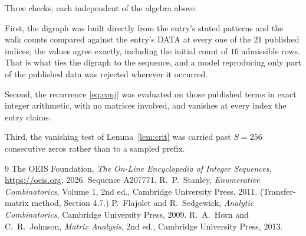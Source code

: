 \documentclass[11pt,a4paper]{article}
\theoremstyle{plain}
\theoremstyle{definition}
\begin{document}
Three checks, each independent of the algebra above.

First, the digraph was built directly from the entry's stated patterns and the walk counts
compared against the entry's DATA at every one of the $21$ published indices; the
values agree exactly, including the initial count of $16$ admissible rows. That is
what ties the digraph to the sequence, and a model reproducing only part of the published
data was rejected wherever it occurred.

Second, the recurrence \eqref{eq:conj} was evaluated on those published terms in exact
integer arithmetic, with no matrices involved, and vanishes at every index the entry claims.

Third, the vanishing test of Lemma~\ref{lem:crit} was carried past $S=256$ consecutive
zeros rather than to a sampled prefix.

\begin{thebibliography}{9}
 The OEIS Foundation, \emph{The On-Line Encyclopedia of Integer
Sequences}, \url{https://oeis.org}, 2026. Sequence A207771.
 R.~P.~Stanley, \emph{Enumerative Combinatorics}, Volume 1, 2nd ed.,
Cambridge University Press, 2011. (Transfer-matrix method, Section 4.7.)
 P.~Flajolet and R.~Sedgewick, \emph{Analytic Combinatorics}, Cambridge
University Press, 2009.
 R.~A.~Horn and C.~R.~Johnson, \emph{Matrix Analysis}, 2nd ed., Cambridge
University Press, 2013.
\end{thebibliography}
\end{document}
